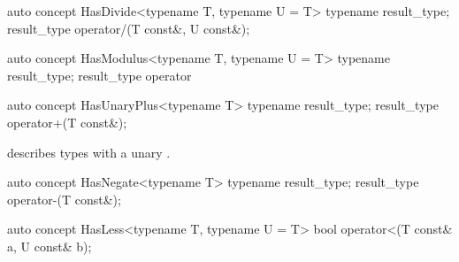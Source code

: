 \documentclass[american,twoside]{book}
\begin{document}
\begin{itemdescr}
\pnum
{}
\end{itemdescr}

\begin{itemdecl}
auto concept HasDivide<typename T, typename U = T> {
  typename result_type;
  result_type operator/(T const&, U const&);
}
\end{itemdecl}

\begin{itemdescr}
\pnum
{}
\end{itemdescr}

\begin{itemdecl}
auto concept HasModulus<typename T, typename U = T> {
  typename result_type;
  result_type operator%
}
\end{itemdecl}

\begin{itemdescr}
\pnum
{}
\end{itemdescr}

\begin{itemdecl}
auto concept HasUnaryPlus<typename T> {
  typename result_type;
  result_type operator+(T const&);
}
\end{itemdecl}

\begin{itemdescr}
\pnum
\mbox{\reallynote} describes types with a unary \mbox{}.
\end{itemdescr}

\begin{itemdecl}
auto concept HasNegate<typename T> {
  typename result_type;
  result_type operator-(T const&);
}
\end{itemdecl}

\begin{itemdescr}
\pnum
{}
\end{itemdescr}

\begin{itemdecl}
auto concept HasLess<typename T, typename U = T> {
  bool operator<(T const& a, U const& b);
}
\end{itemdecl}

\begin{itemdescr}
\pnum
{}
\end{itemdescr}
\end{document}

